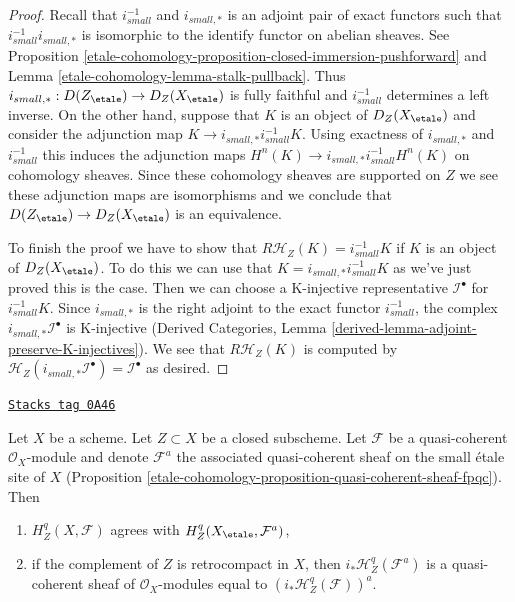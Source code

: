 \begin{proof}
Recall that $i_{small}^{-1}$ and $i_{small, *}$ is an adjoint pair of
exact functors such that $i_{small}^{-1}i_{small, *}$ is isomorphic to
the identify functor on abelian sheaves. See
Proposition \ref{etale-cohomology-proposition-closed-immersion-pushforward} and
Lemma \ref{etale-cohomology-lemma-stalk-pullback}. Thus
$i_{small, *} : D(Z_\etale) \to D_Z(X_\etale)$ is fully faithful and
$i_{small}^{-1}$ determines
a left inverse. On the other hand, suppose that $K$ is an object of
$D_Z(X_\etale)$ and consider the adjunction map
$K \to i_{small, *}i_{small}^{-1}K$.
Using exactness of $i_{small, *}$ and $i_{small}^{-1}$
this induces the adjunction maps
$H^n(K) \to i_{small, *}i_{small}^{-1}H^n(K)$ on cohomology sheaves.
Since these cohomology
sheaves are supported on $Z$ we see these adjunction maps are isomorphisms
and we conclude that $D(Z_\etale) \to D_Z(X_\etale)$ is an equivalence.

\medskip\noindent
To finish the proof we have to show that $R\mathcal{H}_Z(K) = i_{small}^{-1}K$
if $K$ is an object of $D_Z(X_\etale)$. To do this we can use that
$K = i_{small, *}i_{small}^{-1}K$
as we've just proved this is the case. Then we
can choose a K-injective representative $\mathcal{I}^\bullet$ for
$i_{small}^{-1}K$.
Since $i_{small, *}$ is the right adjoint to the exact functor
$i_{small}^{-1}$, the
complex $i_{small, *}\mathcal{I}^\bullet$ is K-injective
(Derived Categories, Lemma \ref{derived-lemma-adjoint-preserve-K-injectives}).
We see that $R\mathcal{H}_Z(K)$ is computed by
$\mathcal{H}_Z(i_{small, *}\mathcal{I}^\bullet) = \mathcal{I}^\bullet$
as desired.
\end{proof}

\begin{lemma}
\label{etale-cohomology-lemma-cohomology-with-support-quasi-coherent}
\href{https://stacks.math.columbia.edu/tag/0A46}{\texttt{Stacks tag 0A46}}

Let $X$ be a scheme. Let $Z \subset X$ be a closed subscheme.
Let $\mathcal{F}$ be a quasi-coherent $\mathcal{O}_X$-module
and denote $\mathcal{F}^a$ the associated quasi-coherent sheaf
on the small \'etale site of $X$
(Proposition \ref{etale-cohomology-proposition-quasi-coherent-sheaf-fpqc}). Then
\begin{enumerate}
\item $H^q_Z(X, \mathcal{F})$ agrees with $H^q_Z(X_\etale, \mathcal{F}^a)$,
\item if the complement of $Z$ is retrocompact in $X$, then
$i_*\mathcal{H}^q_Z(\mathcal{F}^a)$ is a quasi-coherent sheaf of
$\mathcal{O}_X$-modules equal to $(i_*\mathcal{H}^q_Z(\mathcal{F}))^a$.
\end{enumerate}
\end{lemma}

